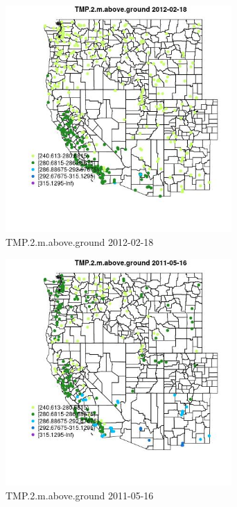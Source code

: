 \begin{figure} 
\centering  
\includegraphics[width=0.77\textwidth]{Code_Outputs/Report_ML_input_PM25_Step4_part_f_de_duplicated_aves_prioritize_24hr_obswNAs_MapObsTMP2maboveground2012-02-18.jpg} 
\caption{\label{fig:Report_ML_input_PM25_Step4_part_f_de_duplicated_aves_prioritize_24hr_obswNAsMapObsTMP2maboveground2012-02-18}TMP.2.m.above.ground 2012-02-18} 
\end{figure} 
 

\clearpage 

\begin{figure} 
\centering  
\includegraphics[width=0.77\textwidth]{Code_Outputs/Report_ML_input_PM25_Step4_part_f_de_duplicated_aves_prioritize_24hr_obswNAs_MapObsTMP2maboveground2011-05-16.jpg} 
\caption{\label{fig:Report_ML_input_PM25_Step4_part_f_de_duplicated_aves_prioritize_24hr_obswNAsMapObsTMP2maboveground2011-05-16}TMP.2.m.above.ground 2011-05-16} 
\end{figure} 
 


